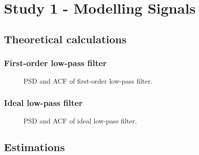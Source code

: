 \section{Study 1 - Modelling Signals}


\subsection{Theoretical calculations}


\subsubsection{First-order low-pass filter}

\begin{figure}[!ht]
\centering

\caption{PSD and ACF of first-order low-pass filter.}
\label{fig:Lab1fig1}
\end{figure}


\subsubsection{Ideal low-pass filter}

\begin{figure}[!ht]
\centering

\caption{PSD and ACF of ideal low-pass filter.}
\label{fig:Lab1fig2}
\end{figure}


\subsection{Estimations}

